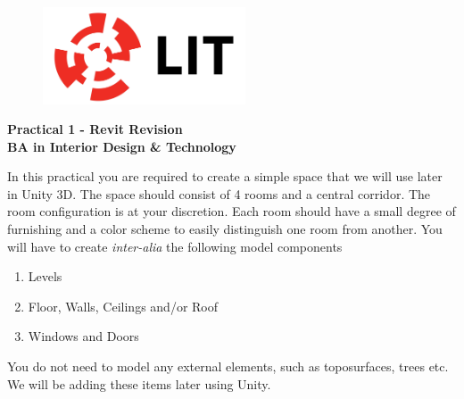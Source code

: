 

\newpage
\setcounter{page}{1}
\begin{center}
	\begin{figure}[ht]
		\centering
		\includegraphics[width = 6cm]{img/LITlogo.jpg}
		\label{fig:logoa1}
	\end{figure}
	\Large\textbf{Practical 1 - Revit Revision}\\
	\large\textbf{BA in Interior Design \& Technology}
\end{center}


In this practical you are required to create a simple space that we will use later in Unity 3D.  The space should consist of 4 rooms and a central corridor.  The room configuration is at your discretion.  Each room should have a small degree of furnishing and a color scheme to easily distinguish one room from another.  You will have to create \textit{inter-alia} the following model components


\begin{enumerate}
	\item Levels
	\item Floor, Walls, Ceilings and/or Roof
	\item Windows and Doors
\end{enumerate}

You do not need to model any external elements, such as toposurfaces, trees etc.  We will be adding these items later using Unity.







